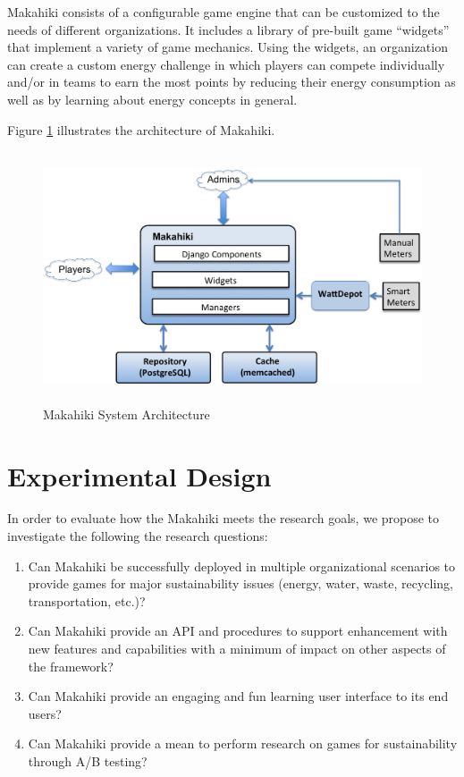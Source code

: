 \documentclass[11pt]{article}
\begin{document}
Makahiki consists of a configurable game engine that can be customized to the needs of
different organizations.  It includes a library of pre-built game ``widgets'' that
implement a variety of game mechanics.  Using the widgets, an organization can create a
custom energy challenge in which players can compete individually and/or in teams to earn
the most points by reducing their energy consumption as well as by learning about energy
concepts in general.

Figure \ref{fig:system-architecture} illustrates
the architecture of Makahiki.

\begin{figure}[htbp] %
   \centering
   \includegraphics[height=20em]{system-architecture.png} 
   \caption{Makahiki System Architecture}
   \label{fig:system-architecture}
\end{figure}


\section{Experimental Design}

In order to evaluate how the Makahiki meets the research goals, we propose to investigate the following the research questions:

\begin{enumerate}

\em \item Can Makahiki be successfully deployed in multiple organizational scenarios to provide games for major sustainability issues (energy, water, waste, recycling, transportation, etc.)? \em
\em \item Can Makahiki provide an API and procedures to support enhancement with new features and capabilities with a minimum of impact on other aspects of the framework? \em
\em \item Can Makahiki provide an engaging and fun learning user interface to its end users? \em
\em \item Can Makahiki provide a mean to perform research on games for sustainability through A/B testing? \em

\end{enumerate}
\end{document}
